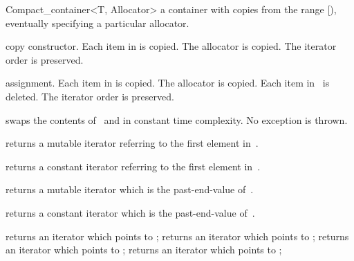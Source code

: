 \begin{ccRefClass}{Compact_container<T, Allocator>}
  {a container with copies from the range [), eventually
   specifying a particular allocator.}

  {copy constructor.  Each item in  is copied.  The allocator
   is copied.  The iterator order is preserved.}

  {assignment. Each item in  is copied.  The allocator is copied.
   Each item in \ccVar\ is deleted.  The iterator order is preserved.}

  {swaps the contents of \ccVar\ and  in constant time
   complexity.  No exception is thrown.}


  \def\ccTagRmTrailingConst{\ccFalse}
  {returns a mutable iterator referring to the first element in~\ccVar.}

  \ccGlue{}
  {returns a constant iterator referring to the first element in~\ccVar.}

  \ccGlue{}
  {returns a mutable iterator which is the past-end-value of~\ccVar.}

  \ccGlue{}
  {returns a constant iterator which is the past-end-value of~\ccVar.}

  \ccGlue{}
  \ccGlue{}
  \ccGlue{}

  {returns an iterator which points to ;}
  \ccGlue{}
  {returns an iterator which points to ;}
  {returns an iterator which points to ;}
  \ccGlue{}
  {returns an iterator which points to ;}
  \def\ccTagRmTrailingConst{\ccTrue}


\end{ccRefClass}
